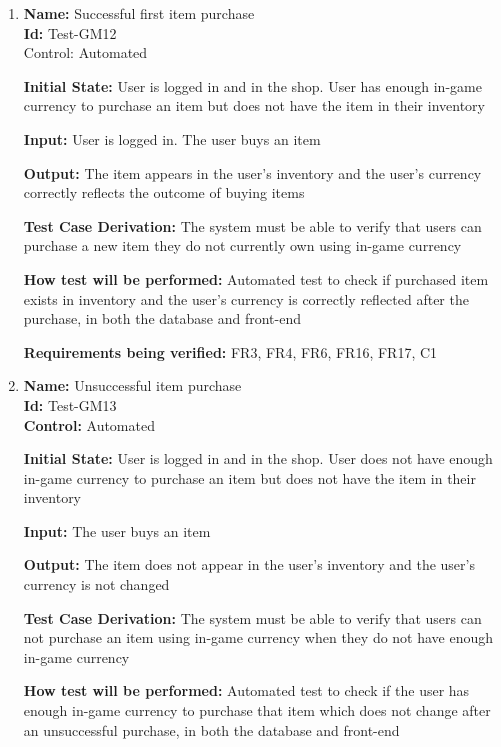\documentclass[12pt, titlepage]{article}
\begin{document}
\begin{enumerate}


\item {\textbf{Name:} Successful first item purchase\\} %
\textbf{Id:} Test-GM12 \label{Test-GM12}\\

Control: Automated

\textbf{Initial State:} User is logged in and in the shop. User has enough in-game currency to purchase an item but does not have the item in their inventory

\textbf{Input:} User is logged in. The user buys an item

\textbf{Output:} The item appears in the user's inventory and the user's currency correctly reflects the outcome of buying items

\textbf{Test Case Derivation:} The system must be able to verify that users can purchase a new item they do not currently own using in-game currency

\textbf{How test will be performed:} Automated test to check if purchased item exists in inventory and the user's currency is correctly reflected after the purchase, in both the database and front-end

\textbf{Requirements being verified:} FR3, FR4, FR6, FR16, FR17, C1

\item {\textbf{Name:} Unsuccessful item purchase\\} %
\textbf{Id:} Test-GM13 \label{Test-GM13}\\

\textbf{Control:} Automated

\textbf{Initial State:} User is logged in and in the shop. User does not have enough in-game currency to purchase an item but does not have the item in their inventory

\textbf{Input:} The user buys an item

\textbf{Output:} The item does not appear in the user's inventory and the user's currency is not changed

\textbf{Test Case Derivation:} The system must be able to verify that users can not purchase an item using in-game currency when they do not have enough in-game currency

\textbf{How test will be performed:} Automated test to check if the user has enough in-game currency to purchase that item which does not change after an unsuccessful purchase, in both the database and front-end


\end{enumerate}
\end{document}
